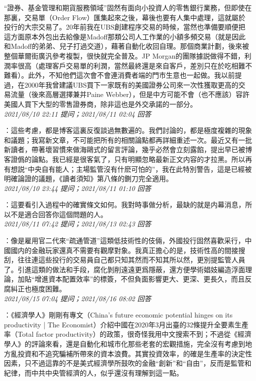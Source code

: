 \documentclass[twocolumn]{ctexart}
\begin{document}
“證券、基金管理和期貨服務領域”固然有面向小投資人的零售銀行業務，但即使在那裏，交易單（Order Flow）匯集起來之後，幕後也要有人集中處理，這就屬於投行的大宗交易了。20年前我在UBS創建程序交易的時候，當然也準備要順便把這方面原本外包出去給像是Madoff那類公司人工作業的小額多頻交易（就是因此和Madoff的弟弟、兒子打過交道），藉著自動化收回自理。那個商業計劃，後來被整個華爾街廣汎參考複製，很快就完全普及。JP Morgan的團隊據説做得不錯，利潤率很高（處理客戶交易單的利潤，當然最終還是來自客戶，差別只在於吃相難不難看）。此外，不知他們這次會不會連消費者端的門市生意也一起做。我以前提過，在2000年我曾建議UBS買下一家既有的美國證券公司來一次性獲取更高的交易流量（後來高層選擇兼并Paine Webber），但是中方可能不會（也不應該）容許美國人買下大型的零售證券商，除非這也是外交承諾的一部分。
\\

\textit{\hfill\noindent\small 2021/08/10 22:11 提问；2021/08/11 02:04 回答}

：這些考慮，都是博客這裏反復談過無數遍的。我們討論的，都是極度複雜的現象和議題；我寫新文章，不可能把所有的相關論點都再詳細重述一次。最近又有一批新讀者，帶著壞習慣來做海鷗式的留言評論，幾乎必然會立刻露餡，提出早已被博客證僞的論點。我已經是很客氣了，只有明顯忽略最新正文内容的才拉黑。所以再有想説“中央自有能人；主場監管沒有什麽可怕的”，我在此特別警告，這是已經被明確論證的議題，《讀者須知》第八條的鍘刀完全適用。
\\

\textit{\hfill\noindent\small 2021/08/10 23:44 提问；2021/08/11 01:10 回答}

：這要看引入過程中的確實條文如何。我對時事做分析，最缺的就是内幕消息，所以不是適合回答你這個問題的人。
\\

\textit{\hfill\noindent\small 2021/08/11 07:42 提问；2021/08/13 02:43 回答}

：像是雇用官二代來“疏通管道”這類低技術性的伎倆，外國投行固然喜歡采行，中國國内的金融玩家還真不需要有觀摩對象。我真正擔心的是，技術性高的間接搜刮，往往連這些投行的交易員自己都只知其然而不知其所以然，更別提監管人員了。引進這類的做法和手段，腐化剝削遠遠更爲隱蔽，還方便學術娼妓編造浮面理論，加貼“增進資本配置效率”的標簽，不但負面影響更大、更深、更長久，而且反腐糾正也極度困難。
\\

\textit{\hfill\noindent\small 2021/08/15 07:04 提问；2021/08/16 08:02 回答}

：《經濟學人》剛剛有專文（China’s future economic potential hinges on its productivity | The Economist）介紹中國在2020年3月出臺的32條提升全要素生產率（Total factor productivity）的政策，很奇怪我用中文搜索不到；不過從《經濟學人》的評論來看，還是自動化和城市化那些老套的宏觀措施，完全沒有考慮到地方亂投資和不追究騙補所帶來的資本浪費。其實投資效率，的確是生產率的決定性因素，只不過這靠的不是美式經濟學所鼓吹的金融“創新”和“自由”，反而是監管和紀律，而中共中央管經濟的人，似乎還沒有理解到這一點。
\end{document}
